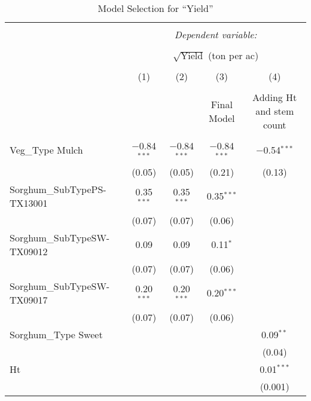 \begin{table}[H] \centering 
\footnotesize
  \caption{Model Selection for ``Yield''} 
  \label{Tab:Tab3} 
\begin{tabular}{@{\extracolsep{5pt}}lccc|c} 
\\[-1.8ex]\hline 
\hline \\[-1.8ex] 
 & \multicolumn{4}{c}{\textit{Dependent variable:}} \\ 
\cline{2-5} 
\\[-1.8ex] & \multicolumn{4}{c}{$\sqrt{\text{Yield}}$ (ton per ac)} \\ 
\\[-1.8ex] & (1) & (2) & (3) & (4)\\ 
\\[-1.8ex] &  &  & Final Model & Adding Ht and stem count\\ 
\hline \\[-1.8ex] 
 Veg\_Type Mulch & $-$0.84$^{***}$ & $-$0.84$^{***}$ & $-$0.84$^{***}$ & $-$0.54$^{***}$ \\ 
  & (0.05) & (0.05) & (0.21) & (0.13) \\ 
 Sorghum\_SubTypePS-TX13001 & 0.35$^{***}$ & 0.35$^{***}$ & 0.35$^{***}$ &  \\ 
  & (0.07) & (0.07) & (0.06) &  \\ 
 Sorghum\_SubTypeSW-TX09012 & 0.09 & 0.09 & 0.11$^{*}$ &  \\ 
  & (0.07) & (0.07) & (0.06) &  \\ 
 Sorghum\_SubTypeSW-TX09017 & 0.20$^{***}$ & 0.20$^{***}$ & 0.20$^{***}$ &  \\ 
  & (0.07) & (0.07) & (0.06) &  \\ 
 Sorghum\_Type Sweet &  &  &  & 0.09$^{**}$ \\ 
  &  &  &  & (0.04) \\ 
 Ht &  &  &  & 0.01$^{***}$ \\ 
  &  &  &  & (0.001) \\ 

\end{tabular}
\end{table}
